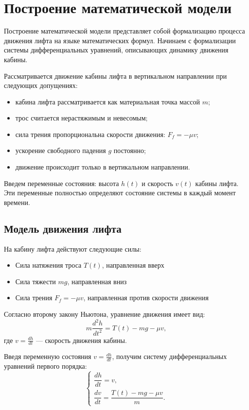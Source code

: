 \documentclass[a4paper, 14pt]{extarticle}
\begin{document}
\section{Построение математической модели}
Построение математической модели представляет собой формализацию процесса движения лифта на языке математических формул. Начинаем с формализации системы дифференциальных уравнений, описывающих динамику движения кабины.

Рассматривается движение кабины лифта в вертикальном направлении при следующих допущениях:
\begin{itemize}
  \item кабина лифта рассматривается как материальная точка массой $m$;
  \item трос считается нерастяжимым и невесомым;
  \item сила трения пропорциональна скорости движения: $F_f = -\mu v$;
  \item ускорение свободного падения $g$ постоянно;
  \item движение происходит только в вертикальном направлении.
\end{itemize}

Введем переменные состояния: высота $h(t)$ и скорость $v(t)$ кабины лифта. Эти переменные полностью определяют состояние системы в каждый момент времени.

\subsection{Модель движения лифта}

На кабину лифта действуют следующие силы:
\begin{itemize}
  \item Сила натяжения троса $T(t)$, направленная вверх
  \item Сила тяжести $mg$, направленная вниз
  \item Сила трения $F_f = -\mu v$, направленная против скорости движения
\end{itemize}

Согласно второму закону Ньютона, уравнение движения имеет вид:
\[
m\frac{d^2h}{dt^2} = T(t) - mg - \mu v,
\]
где $v = \frac{dh}{dt}$ --- скорость движения кабины.

Введя переменную состояния $v = \frac{dh}{dt}$, получим систему дифференциальных уравнений первого порядка:
\[
\begin{cases}
  \dfrac{dh}{dt} = v,\\
  \dfrac{dv}{dt} = \dfrac{T(t) - mg - \mu v}{m}.
\end{cases}
\]
\end{document}
